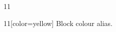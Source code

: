 \documentclass[paper=A4]{ropas-poster}
\begin{document}
\begin{postergrid}{1}{1}
\begin{posterblock}{1}{1}[color=yellow]
Block colour alias.
\end{posterblock}
\end{postergrid}
\end{document}
